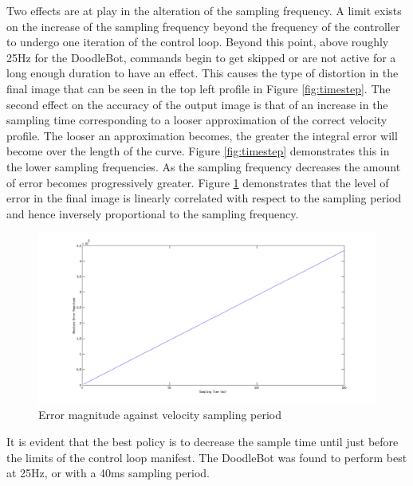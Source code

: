 Two effects are at play in the alteration of the sampling frequency. A limit exists on the increase of the sampling frequency beyond the frequency of the controller to undergo one iteration of the control loop. Beyond this point, above roughly 25Hz for the DoodleBot, commands begin to get skipped or are not active for a long enough duration to have an effect. This causes the type of distortion in the final image that can be seen in the top left profile in Figure \ref{fig:timestep}. The second effect on the accuracy of the output image is that of an increase in the sampling time corresponding to a looser approximation of the correct velocity profile. The looser an approximation becomes, the greater the integral error will become over the length of the curve. Figure \ref{fig:timestep} demonstrates this in the lower sampling frequencies. As the sampling frequency decreases the amount of error becomes progressively greater. Figure \ref{fig:tStep} demonstrates that the level of error in the final image is linearly correlated with respect to the sampling period and hence inversely proportional to the sampling frequency. 
\begin{figure}[htbp]  
\includegraphics[width=\textwidth]{figures/performance/tStep.png}
\caption[Plot of error magnitude against velocity sampling period]{Error magnitude against velocity sampling period
\label{fig:tStep}}
\end{figure}  
It is evident that the best policy is to decrease the sample time until just before the limits of the control loop manifest. The DoodleBot was found to perform best at 25Hz, or with a 40ms sampling period.